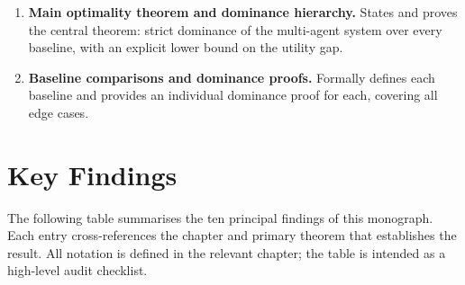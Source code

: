 \documentclass[12pt,openany]{book}
\numberwithin{equation}{chapter}
\theoremstyle{plain}
\theoremstyle{definition}
\theoremstyle{remark}
\numberwithin{equation}{chapter}
\theoremstyle{plain}
\begin{document}
\begin{enumerate}[label=\textbf{Ch.~\arabic*.}, leftmargin=3.5em,
                  itemsep=3pt, parsep=0pt, topsep=4pt]
  \item \textbf{Main optimality theorem and dominance hierarchy.}\enspace
        States and proves the central theorem: strict dominance of
        the multi-agent system over every baseline, with an
        explicit lower bound on the utility gap.

  \item \textbf{Baseline comparisons and dominance proofs.}\enspace
        Formally defines each baseline and provides an individual
        dominance proof for each, covering all edge cases.
\end{enumerate}

\chapter*{Key Findings}

\noindent
The following table summarises the ten principal findings of this
monograph.  Each entry cross-references the chapter and primary
theorem that establishes the result.  All notation is defined in the
relevant chapter; the table is intended as a high-level audit
checklist.
\end{document}
